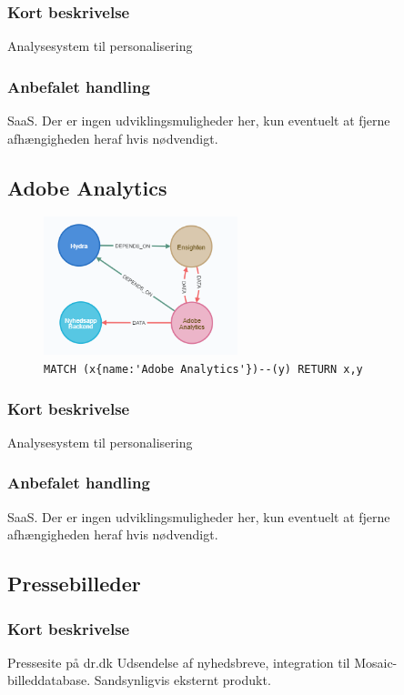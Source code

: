 \documentclass{article}
\begin{document}
\subsubsection*{Kort beskrivelse}
Analysesystem til personalisering
\subsubsection*{Anbefalet handling}
SaaS. Der er ingen udviklingsmuligheder her, kun eventuelt at fjerne afhængigheden heraf hvis nødvendigt.



\subsection{Adobe Analytics}
\begin{figure}[H]
\includegraphics[width=160pt]{AdobeAnalytics.PNG}
\cprotect\caption{\verb|MATCH (x{name:'Adobe Analytics'})--(y) RETURN x,y|}
\end{figure}
\subsubsection*{Kort beskrivelse}
Analysesystem til personalisering
\subsubsection*{Anbefalet handling}
SaaS. Der er ingen udviklingsmuligheder her, kun eventuelt at fjerne afhængigheden heraf hvis nødvendigt.



\subsection{Pressebilleder}
\subsubsection*{Kort beskrivelse}
Pressesite på dr.dk Udsendelse af nyhedsbreve, integration til Mosaic-billeddatabase. Sandsynligvis eksternt produkt.
\end{document}
